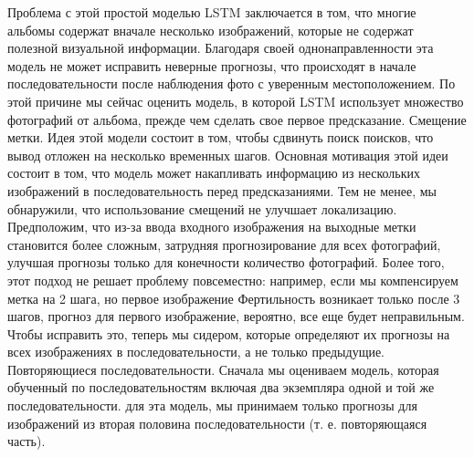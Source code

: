 Проблема с этой простой моделью LSTM заключается в том, что многие
альбомы содержат вначале несколько изображений, которые
не содержат полезной визуальной информации. Благодаря своей однонаправленности эта модель не может исправить неверные прогнозы, что
происходят в начале последовательности после наблюдения
фото с уверенным местоположением. По этой причине мы сейчас
оценить модель, в которой LSTM использует множество фотографий
от альбома, прежде чем сделать свое первое предсказание.
Смещение метки. Идея этой модели состоит в том, чтобы сдвинуть 
поиск поисков, что вывод отложен на несколько временных шагов. Основная мотивация этой идеи состоит в том, что модель может накапливать информацию из нескольких изображений в
последовательность перед предсказаниями. Тем не менее, мы
обнаружили, что использование смещений не улучшает локализацию. Предположим, что
из-за ввода входного изображения на выходные метки
становится более сложным, затрудняя прогнозирование
для всех фотографий, улучшая прогнозы только для конечности
количество фотографий. Более того, этот подход не
решает проблему повсеместно: например, если мы компенсируем
метка на 2 шага, но первое изображение Фертильность возникает только после 3 шагов, прогноз для первого
изображение, вероятно, все еще будет неправильным. Чтобы исправить это, теперь мы сидером, которые определяют их прогнозы на всех изображениях
в последовательности, а не только предыдущие. Повторяющиеся последовательности. Сначала мы оцениваем модель, которая
обученный по последовательностям
включая два экземпляра одной и той же последовательности. для эта модель, мы принимаем только прогнозы для изображений из вторая половина последовательности (т. е. повторяющаяся часть).

